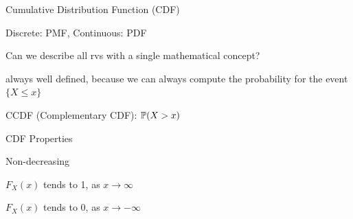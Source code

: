 \documentclass[handout,fleqn,aspectratio=169]{beamer}
\begin{document}
\begin{frame}{Cumulative Distribution Function (CDF)}

{
\small
\vspace{0.1in}
\plitemsep 0.1in
\bci 
\item<1-> Discrete: PMF, Continuous: PDF
\item<2-> Can we describe all rvs with a single mathematical concept? 
\item<4-> always well defined, because we can always compute the probability for the event $\{X \le x \}$

\item<5-> CCDF (Complementary CDF): $\mathbb{P}( X > x  )$
\eci 
}
{

}
\end{frame}

\begin{frame}{CDF Properties}


\bigskip

\plitemsep 0.3in
\bci 
\item<2-> Non-decreasing

\item<3-> $F_X(x)$ tends to 1, as $x \rightarrow \infty$

\item<3-> $F_X(x)$ tends to 0, as $x \rightarrow -\infty$

\eci 
\bigskip

\end{frame}
\end{document}
